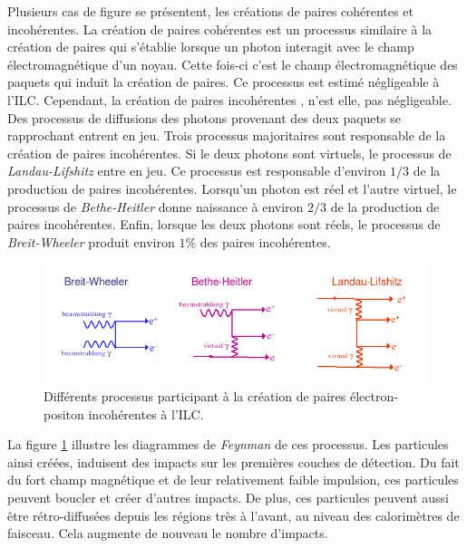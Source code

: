   \medskip
  
  Plusieurs cas de figure se pr\'esentent, les cr\'eations de paires coh\'erentes et incoh\'erentes. La cr\'eation de paires coh\'erentes \cite{Chen:1989fd} est un processus similaire \`a la cr\'eation de paires qui s'\'etablie lorsque un photon interagit avec le champ \'electromagn\'etique d'un noyau. Cette fois-ci c'est le champ \'electromagn\'etique des paquets qui induit la cr\'eation de paires. Ce processus est estim\'e n\'egligeable \`a l'ILC. Cependant, la cr\'eation de paires incoh\'erentes \cite{Zolotorev:1987wk}, n'est elle, pas n\'egligeable. Des processus de diffusions des photons provenant des deux paquets se rapprochant entrent en jeu. Trois processus majoritaires sont responsable de la cr\'eation de paires incoh\'erentes. Si le deux photons sont virtuels, le processus de \textit{Landau-Lifshitz} entre en jeu. Ce processus est responsable d'environ $1/3$ de la production de paires incoh\'erentes. Lorsqu'un photon est r\'eel et l'autre virtuel, le processus de \textit{Bethe-Heitler} donne naissance \`a environ $2/3$ de la production de paires incoh\'erentes. Enfin, lorsque les deux photons sont r\'eels, le processus de \textit{Breit-Wheeler} produit environ $1\%$ des paires incoh\'erentes. 
  
  \begin{figure}[!htb]
    \begin{center} 
      \includegraphics[scale=0.60]{./figures/beamstrahlung_processes.png}
      \caption{Diff\'erents processus participant \`a la cr\'eation de paires \'electron-positon incoh\'erentes \cite{Zolotorev:1987wk} \`a l'ILC.}
      \label{fig:beamstrahlung_processes}
    \end{center}
  \end{figure}
  
  \medskip
  
  La figure \ref{fig:beamstrahlung_processes} illustre les diagrammes de \textit{Feynman} de ces processus. Les particules ainsi cr\'e\'ees, induisent des impacts sur les premi\`eres couches de d\'etection. Du fait du fort champ magn\'etique et de leur relativement faible impulsion, ces particules peuvent boucler et cr\'eer d'autres impacts. De plus, ces particules peuvent aussi \^etre r\'etro-diffus\'ees depuis les r\'egions tr\`es \`a l'avant, au niveau des calorim\`etres de faisceau. Cela augmente de nouveau le nombre d'impacts.
  

